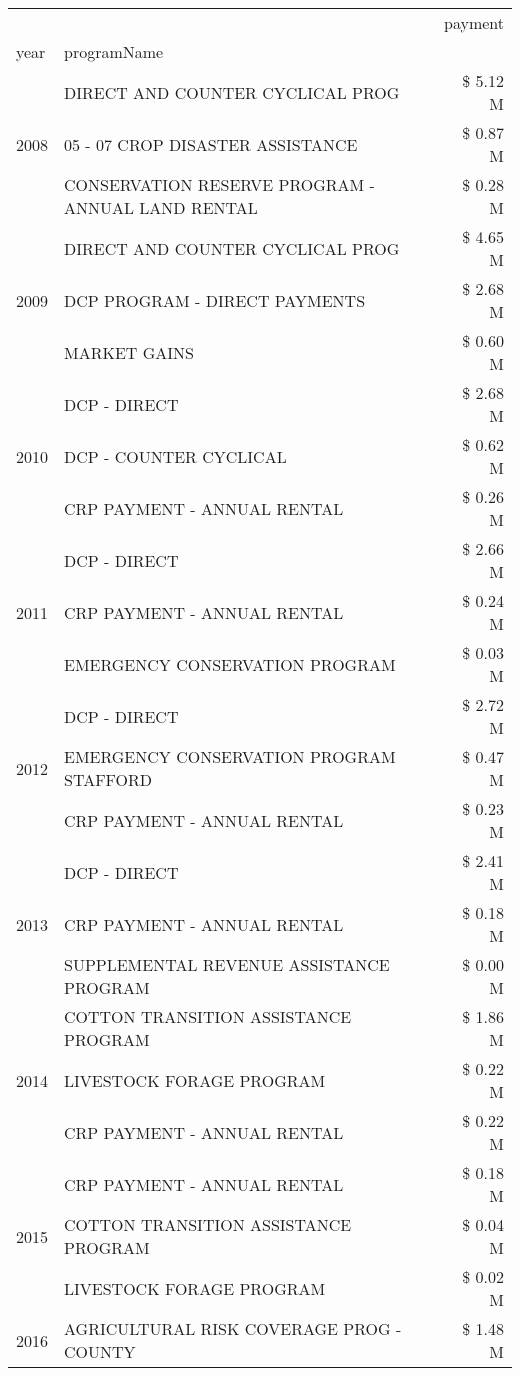 \begin{tabular}{llr}
\toprule
 &  & payment \\
year & programName &  \\
\midrule
\multirow[t]{3}{*}{2008} & DIRECT AND COUNTER CYCLICAL PROG & \$ 5.12 M \\
 & 05 - 07 CROP DISASTER ASSISTANCE & \$ 0.87 M \\
 & CONSERVATION RESERVE PROGRAM - ANNUAL LAND RENTAL & \$ 0.28 M \\
\cline{1-3}
\multirow[t]{3}{*}{2009} & DIRECT AND COUNTER CYCLICAL PROG & \$ 4.65 M \\
 & DCP PROGRAM - DIRECT PAYMENTS & \$ 2.68 M \\
 & MARKET GAINS & \$ 0.60 M \\
\cline{1-3}
\multirow[t]{3}{*}{2010} & DCP - DIRECT & \$ 2.68 M \\
 & DCP - COUNTER CYCLICAL & \$ 0.62 M \\
 & CRP PAYMENT - ANNUAL RENTAL & \$ 0.26 M \\
\cline{1-3}
\multirow[t]{3}{*}{2011} & DCP - DIRECT & \$ 2.66 M \\
 & CRP PAYMENT - ANNUAL RENTAL & \$ 0.24 M \\
 & EMERGENCY CONSERVATION PROGRAM & \$ 0.03 M \\
\cline{1-3}
\multirow[t]{3}{*}{2012} & DCP - DIRECT & \$ 2.72 M \\
 & EMERGENCY CONSERVATION PROGRAM STAFFORD & \$ 0.47 M \\
 & CRP PAYMENT - ANNUAL RENTAL & \$ 0.23 M \\
\cline{1-3}
\multirow[t]{3}{*}{2013} & DCP - DIRECT & \$ 2.41 M \\
 & CRP PAYMENT - ANNUAL RENTAL & \$ 0.18 M \\
 & SUPPLEMENTAL REVENUE ASSISTANCE PROGRAM & \$ 0.00 M \\
\cline{1-3}
\multirow[t]{3}{*}{2014} & COTTON TRANSITION ASSISTANCE PROGRAM & \$ 1.86 M \\
 & LIVESTOCK FORAGE PROGRAM & \$ 0.22 M \\
 & CRP PAYMENT - ANNUAL RENTAL & \$ 0.22 M \\
\cline{1-3}
\multirow[t]{3}{*}{2015} & CRP PAYMENT - ANNUAL RENTAL & \$ 0.18 M \\
 & COTTON TRANSITION ASSISTANCE PROGRAM & \$ 0.04 M \\
 & LIVESTOCK FORAGE PROGRAM & \$ 0.02 M \\
\cline{1-3}
\multirow[t]{3}{*}{2016} & AGRICULTURAL RISK COVERAGE PROG - COUNTY & \$ 1.48 M \\

\end{tabular}
